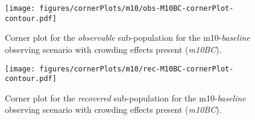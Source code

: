 \documentclass[twocolumn]{aastex63}
\begin{document}
\begin{figure}
    \centering
    \texttt{[image: figures/cornerPlots/m10/obs-M10BC-cornerPlot-contour.pdf]}
    \caption{Corner plot for the \textit{observable} sub-population for the m10-\textit{baseline} observing scenario with crowding effects present (\textit{m10BC}).}
    \label{fig:m10bc-Obs-corner-plot-appendix}
\end{figure}\clearpage

\begin{figure}
    \centering
    \texttt{[image: figures/cornerPlots/m10/rec-M10BC-cornerPlot-contour.pdf]}
    \caption{Corner plot for the \textit{recovered} sub-population for the m10-\textit{baseline} observing scenario with crowding effects present (\textit{m10BC}).}
    \label{fig:m10bc-Rec-corner-plot-appendix}
\end{figure}\clearpage
\end{document}
